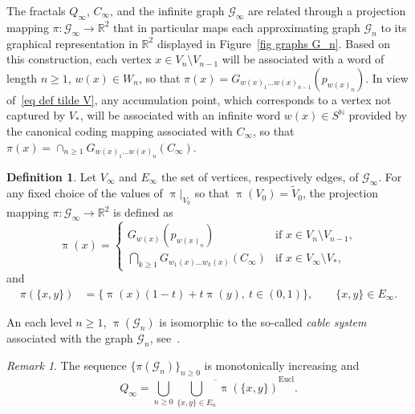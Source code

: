 \documentclass[11pt]{amsart}
\theoremstyle{definition}
\newtheorem{definition}{Definition}[section]
\theoremstyle{remark}
\newtheorem{remark}{Remark}[section]
\theoremstyle{example}
\numberwithin{equation}{section}
\begin{document}
The fractals $Q_\infty$, $C_\infty$, and the infinite graph ${\mathcal{G}}_\infty$ are related through a projection mapping $\pi\colon{\mathcal{G}}_\infty\to{{\mathbb R}}^2$ that in particular maps each approximating graph ${\mathcal{G}}_n$ to its graphical representation in ${{\mathbb R}}^2$ displayed in Figure~\ref{fig graphs G_n}. Based on this construction, each vertex $x\in V_n\setminus V_{n-1}$ will be associated with a word of length $n\geq 1$, $w(x)\in W_n$, so that $\pi(x)=G_{w(x)_1\ldots w(x)_{n-1}}(p_{w(x)_n})$. In view of~\eqref{eq def tilde V}, any accumulation point, which corresponds to a vertex not captured by $V_*$, will be associated with an infinite word $w(x)\in S^{{\mathbb N}}$ provided by the canonical coding mapping associated with $C_\infty$, so that $\pi(x)=\cap_{n\geq 1}G_{w(x)_1\ldots w(x)_n}(C_\infty)$.

\medskip

\begin{definition}\label{def proj}
Let $V_\infty$ and $E_\infty$ the set of vertices, respectively edges, of ${\mathcal{G}}_\infty$. For any fixed choice of the values of $\operatorname{\pi}|_{V_0}$ so that $\operatorname{\pi}(V_0)=\widetilde{V}_0$, the projection mapping $\pi\colon{\mathcal{G}}_\infty\to{{\mathbb R}}^2$ is defined as
\[
\operatorname{\pi}(x)=\left\{\begin{array}{ll}
G_{w(x)}(p_{w(x)_n})&\text{if }x\in V_n\setminus V_{n-1},\\
\bigcap_{k\geq 1}G_{w_1(x)\ldots w_k(x)}(C_\infty)&\text{if }x\in V_\infty\setminus V_*,
\end{array}\right.
\]
and
\begin{align*}
\pi(\{x,y\})&=\{\operatorname{\pi}(x)(1-t)+t\operatorname{\pi}(y),~t\in (0,1)\},\qquad  \{x,y\}\in E_\infty.
\end{align*} 
\end{definition}
An each level $n\geq 1$, $\operatorname{\pi}({\mathcal{G}}_n)$ is isomorphic to the so-called \textit{cable system} associated with the graph ${\mathcal{G}}_n$, see~\cite{BB04}.

\begin{remark}\label{rem Qalpha}
The sequence $\{\pi({\mathcal{G}}_n)\}_{n\geq 0}$ is monotonically increasing and
\[
Q_\infty=\overline{\bigcup_{n\geq 0}\bigcup_{\{x,y\}\in E_n}\operatorname{\pi}(\{x,y\})}^{\text{Eucl}}.
\]
\end{remark}
\end{document}
